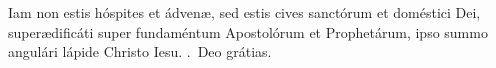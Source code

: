 \lettrine[lines=3]{I}{}am non estis hóspites et ádvenæ, sed estis cives sanctórum et doméstici Dei, superædificáti super fundaméntum Apostolórum et Pro\-phe\-tár\-um, ipso summo angulári lápide Christo Iesu. \Rbar.~Deo grátias.
